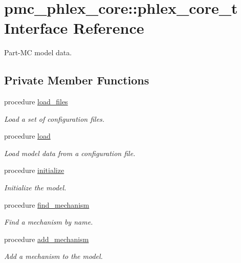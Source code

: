 \hypertarget{structpmc__phlex__core_1_1phlex__core__t}{}\section{pmc\+\_\+phlex\+\_\+core\+:\+:phlex\+\_\+core\+\_\+t Interface Reference}
\label{structpmc__phlex__core_1_1phlex__core__t}


Part-\/\+MC model data.  


\subsection*{Private Member Functions}
\begin{DoxyCompactItemize}
\item 
procedure \mbox{\hyperlink{structpmc__phlex__core_1_1phlex__core__t_a0b265ff3c61b1dcb3adf39b9dccad15d}{load\+\_\+files}}
\begin{DoxyCompactList}\small\item\em Load a set of configuration files. \end{DoxyCompactList}\item 
procedure \mbox{\hyperlink{structpmc__phlex__core_1_1phlex__core__t_ae891a2e27ceea18851467c7d81f13df9}{load}}
\begin{DoxyCompactList}\small\item\em Load model data from a configuration file. \end{DoxyCompactList}\item 
procedure \mbox{\hyperlink{structpmc__phlex__core_1_1phlex__core__t_a63d4aee911253595d6193e23150f543d}{initialize}}
\begin{DoxyCompactList}\small\item\em Initialize the model. \end{DoxyCompactList}\item 
procedure \mbox{\hyperlink{structpmc__phlex__core_1_1phlex__core__t_a7def2722ec3d3d713cc875ce0de08000}{find\+\_\+mechanism}}
\begin{DoxyCompactList}\small\item\em Find a mechanism by name. \end{DoxyCompactList}\item 
procedure \mbox{\hyperlink{structpmc__phlex__core_1_1phlex__core__t_a2bf78983070d7e96cc84fc4594ff551d}{add\+\_\+mechanism}}
\begin{DoxyCompactList}\small\item\em Add a mechanism to the model. \end{DoxyCompactList}\item 

\end{DoxyCompactItemize}

